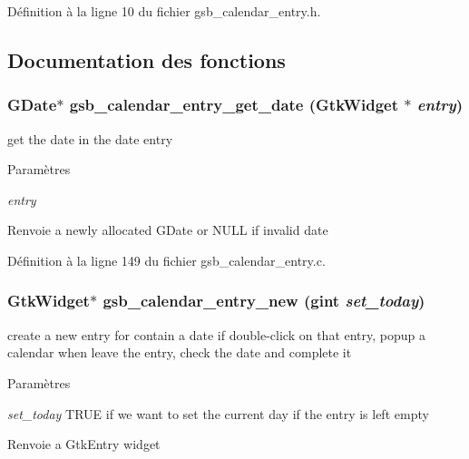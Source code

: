 Définition à la ligne 10 du fichier gsb\_\-calendar\_\-entry.h.



\subsection{Documentation des fonctions}
\subsubsection[{gsb\_\-calendar\_\-entry\_\-get\_\-date}]{\setlength{\rightskip}{0pt plus 5cm}GDate$\ast$ gsb\_\-calendar\_\-entry\_\-get\_\-date (GtkWidget $\ast$ {\em entry})}\label{gsb__calendar__entry_8h_a8cb2e700394a337d8442f42cfdb311ef}
get the date in the date entry


\begin{DoxyParams}{Paramètres}
\item[{\em entry}]\end{DoxyParams}
\begin{DoxyReturn}{Renvoie}
a newly allocated GDate or NULL if invalid date 
\end{DoxyReturn}


Définition à la ligne 149 du fichier gsb\_\-calendar\_\-entry.c.

\subsubsection[{gsb\_\-calendar\_\-entry\_\-new}]{\setlength{\rightskip}{0pt plus 5cm}GtkWidget$\ast$ gsb\_\-calendar\_\-entry\_\-new (gint {\em set\_\-today})}\label{gsb__calendar__entry_8h_afc3a9a10d06b658715e71451cd8bd97f}
create a new entry for contain a date if double-\/click on that entry, popup a calendar when leave the entry, check the date and complete it


\begin{DoxyParams}{Paramètres}
\item[{\em set\_\-today}]TRUE if we want to set the current day if the entry is left empty\end{DoxyParams}
\begin{DoxyReturn}{Renvoie}
a GtkEntry widget 
\end{DoxyReturn}


